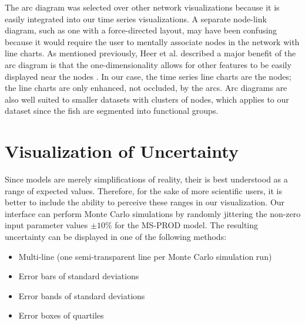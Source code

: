 The arc diagram was selected over other network visualizations because it is easily integrated into our time series visualizations.  A separate node-link diagram, such as one with a force-directed layout, may have been confusing because it would require the user to mentally associate nodes in the network with line charts.  As mentioned previously, Heer et al. described a major benefit of the arc diagram is that the one-dimensionality allows for other features to be easily displayed near the nodes \cite{heer2010}.  In our case, the time series line charts are the nodes; the line charts are only enhanced, not occluded, by the arcs.  Arc diagrams are also well suited to smaller datasets with clusters of nodes, which applies to our dataset since the fish are segmented into functional groups.



\section{Visualization of Uncertainty}

Since models are merely simplifications of reality, their is best understood as a range of expected values.  Therefore, for the sake of more scientific users, it is better to include the ability to perceive these ranges in our visualization.  Our interface can perform Monte Carlo simulations by randomly jittering the non-zero input parameter values $\pm 10\%$ for the MS-PROD model.  The resulting uncertainty can be displayed in one of the following methods:

 \begin{itemize}
   \item Multi-line (one semi-transparent line per Monte Carlo simulation run)
   \item Error bars of standard deviations
   \item Error bands of standard deviations
   \item Error boxes of quartiles
 \end{itemize}
